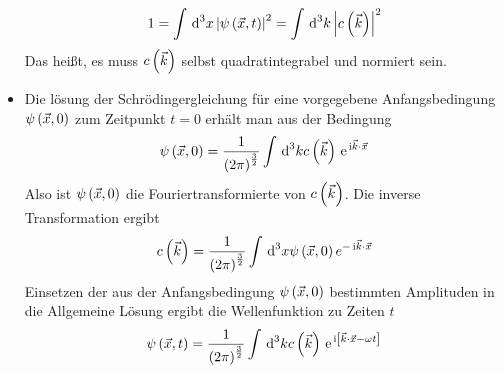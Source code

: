\begin{itemize}
  \begin{equation}
    1 = \int \dn{x}{3} \Norm{\psi\of{\vX,t}}^2= \int \dn{k}{3} \Norm{c\of{\vK}}^2
  \end{equation}
  Das heißt, es muss $c\of{\vK}$ selbst quadratintegrabel und normiert sein.
  \item Die lösung der Schrödingergleichung für eine vorgegebene Anfangsbedingung $\psi\of{\vX,0}$ zum Zeitpunkt $t = 0$ erhält man aus der Bedingung
  \begin{equation}
    \psi\of{\vX,0} = \frac{1}{\norBra{2\pi}^\frac{3}{2}}\int \dn{k}{3} c\of{\vK} \e{\mI\vK\cdot\vX}
  \end{equation}
  Also ist $\psi\of{\vX,0}$ die Fouriertransformierte von $c\of{\vK}$. Die inverse Transformation ergibt
  \begin{equation}
    c\of{\vK} = \frac{1}{\norBra{2\pi}^{\frac32}} \int \dn{x}{3} \psi\of{\vX,0} e^{-\mI\vK\cdot\vX}
  \end{equation}
  Einsetzen der aus der Anfangsbedingung $\psi\of{\vX,0}$ bestimmten Amplituden in die Allgemeine Lösung ergibt die Wellenfunktion zu Zeiten $t$
  \begin{equation}
    \psi\of{\vX,t} = \frac{1}{\norBra{2\pi}^\frac{3}{2}} \int \dn{k}{3} c\of{\vK} \e{\mI\edgBra{\vK\cdot\vX - \omega t}}
  \end{equation}
\end{itemize}

